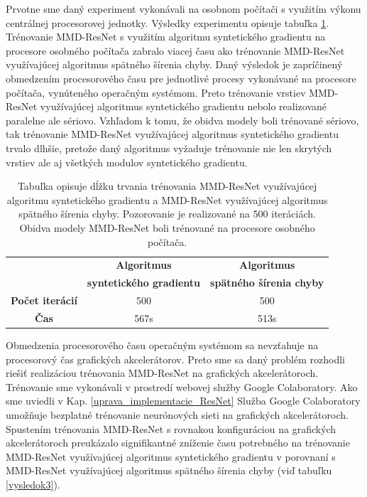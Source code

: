 Prvotne sme daný experiment vykonávali na osobnom počítači s využitím výkonu centrálnej procesorovej jednotky. Výsledky experimentu opisuje tabuľka \ref{vysledok2}. Trénovanie MMD-ResNet s využitím algoritmu syntetického gradientu na procesore osobného počítača zabralo viacej času ako trénovanie MMD-ResNet využívajúcej algoritmus spätného šírenia chyby. Daný výsledok je zapríčinený obmedzením procesorového času pre jednotlivé procesy vykonávané na procesore počítača, vynúteného operačným systémom. Preto trénovanie vrstiev MMD-ResNet využívajúcej algoritmus syntetického gradientu nebolo realizované paralelne ale sériovo. Vzhľadom k tomu, že obidva modely boli trénované sériovo, tak trénovanie MMD-ResNet využívajúcej algoritmus syntetického gradientu trvalo dlhšie, pretože daný algoritmus vyžaduje trénovanie nie len skrytých vrstiev ale aj všetkých modulov syntetického gradientu.

\begin{table}
\caption[Trénovanie MMD-ResNet na procesore počítača]{Tabuľka opisuje dĺžku trvania trénovania MMD-ResNet využívajúcej algoritmu syntetického gradientu a MMD-ResNet využívajúcej algoritmus spätného šírenia chyby. Pozorovanie je realizované na 500 iteráciách. Obidva modely MMD-ResNet boli trénované na procesore osobného počítača.}
\label{vysledok2}
\begin{center}
\begin{tabular}{|c|c|c|}
\hline
  & \textbf{Algoritmus} & \textbf{Algoritmus} \\
  & \textbf{syntetického gradientu} & \textbf{spätného šírenia chyby} \\
\hline
\textbf{Počet iterácií} & 500 & 500 \\
\hline
\textbf{Čas} & 567s & 513s \\
\hline
\end{tabular}%
\end{center}
\end{table}

Obmedzenia procesorového času operačným systémom sa nevzťahuje na procesorový čas grafických akcelerátorov. Preto sme sa daný problém rozhodli riešiť realizáciou trénovania MMD-ResNet na grafických akcelerátoroch. Trénovanie sme vykonávali v prostredí webovej služby Google Colaboratory. Ako sme uviedli v Kap. \ref{uprava_implementacie_ResNet} Služba Google Colaboratory umožňuje bezplatné trénovanie neurónových sieti na grafických akcelerátoroch. Spustením trénovania MMD-ResNet s rovnakou konfiguráciou na grafických akcelerátoroch preukázalo signifikantné zníženie času potrebného na trénovanie MMD-ResNet využívajúcej algoritmus syntetického gradientu v porovnaní s MMD-ResNet využívajúcej algoritmus spätného šírenia chyby (viď tabuľku \ref{vysledok3}).

